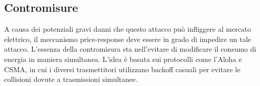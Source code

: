 \subsection{Contromisure}
A causa dei potenziali gravi danni che questo attacco può infliggere al mercato elettrico, il meccanismo price-response deve essere in grado di impedire un tale attacco. L'essenza della contromisura sta nell'evitare di modificare il consumo di energia in maniera simultanea. L'idea è basata sui protocolli come l'Aloha e CSMA, in cui i diversi trasmettitori utilizzano backoff casuali per evitare le collisioni dovute a trasmissioni simultanee.

